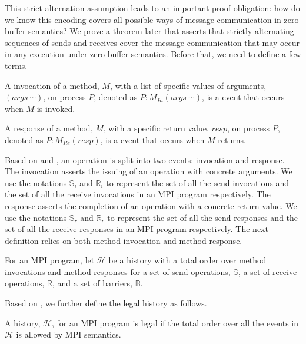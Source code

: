 This strict alternation assumption leads to an important proof obligation: how do we know this encoding covers all possible ways of message communication in zero buffer semantics? We prove a theorem later that asserts that strictly alternating sequences of sends and receives cover the message communication that may occur in any execution under zero buffer semantics. Before that, we need to define a few terms.

\begin{definition}\label{def:invocation}
A invocation of a method, $M$, with a list of specific values of arguments, $(args\ \cdots)$, on process $P$, denoted as $P:M_\mathit{In}(args\ \cdots)$, is a event that occurs when $M$ is invoked.
\end{definition}

\begin{definition}\label{def:response}
A response of a method, $M$, with a specific return value, $resp$, on process $P$, denoted as $P:M_\mathit{Re}(resp)$, is a event that occurs when $M$ returns.
\end{definition}

Based on  and , an operation is split into two events: invocation and response. The invocation asserts the issuing of an operation with concrete arguments. We use the notations $\mathbb{S}_i$ and $\mathbb{R}_i$ to represent the set of all the send invocations and the set of all the receive invocations in an MPI program respectively. The response asserts the completion of an operation with a concrete return value. We use the notations $\mathbb{S}_r$ and $\mathbb{R}_r$ to represent the set of all the send responses and the set of all the receive responses in an MPI program respectively. The next definition relies on both method invocation and method response. 

\begin{definition}[History]\label{def:history}
For an MPI program, let $\mathcal{H}$ be a history with a total order over method invocations and method responses for a set of send operations, $\mathbb{S}$, a set of receive operations, $\mathbb{R}$, and a set of barriers, $\mathbb{B}$.
\end{definition}

Based on , we further define the legal history as follows.

\begin{definition}\label{def:legal}
A history, $\mathcal{H}$, for an MPI program is legal if the total order over all the events in $\mathcal{H}$ is allowed by MPI semantics.
\end{definition}

